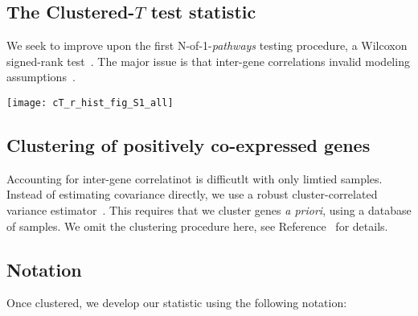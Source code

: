 \documentclass[a0,portrait]{a0poster}
\begin{document}
\begin{multicols}{3}
\section{The Clustered-$T$ test statistic}
We seek to improve upon the first N-of-1-\textit{pathways} testing procedure, a Wilcoxon signed-rank test~\cite{Gardeux2014}. The major issue is that inter-gene correlations invalid modeling assumptions~\cite{Tamayo2016}.

\begin{center}\vspace{1cm}
\texttt{[image: cT\_r\_hist\_fig\_S1\_all]}
\end{center}\vspace{1cm}

\subsection{Clustering of positively co-expressed genes}
Accounting for inter-gene correlatinot is difficutlt with only limtied samples. Instead of estimating covariance directly, we use a robust cluster-correlated variance estimator~\cite{Williams2000}. This requires that we cluster genes \textit{a priori}, using a database of samples. We omit the clustering procedure here, see Reference~\cite{Schissler2018} for details.

\subsection{Notation}
Once clustered, we develop our statistic using the following notation:\\


\end{multicols}
\end{document}
